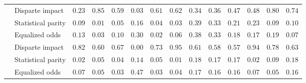 \begin{sidewaystable}
\begin{tabular}{ll
            				ccc
            				ccc
            				ccc
            				ccc}
              & Disparte impact&  $ 0.23 $ &  $ \mathbf{0.85} $ &  $ \mathbf{0.59} $ &  $ 0.03 $ &  $ \mathbf{0.61} $ &  $ \mathbf{0.62} $ &  $ 0.34 $ &  $ \mathbf{0.36} $ &  $ \mathbf{0.47} $ &  $ 0.48 $ &  $ \mathbf{0.80} $ &  $ \mathbf{0.74} $  \\
              & Statistical parity&  $ 0.09 $ &  $ \mathbf{0.01} $ &  $ \mathbf{0.05} $ &  $ 0.16 $ &  $ \mathbf{0.04} $ &  $ \mathbf{0.03} $ &  $ 0.39 $ &  $ \mathbf{0.33} $ &  $ \mathbf{0.21} $ &  $ 0.23 $ &  $ \mathbf{0.09} $ &  $ \mathbf{0.10} $  \\
              & Equalized odds&  $ 0.13 $ &  $ \mathbf{0.03} $ &  $ \mathbf{0.10} $ &  $ 0.30 $ &  $ \mathbf{0.02} $ &  $ \mathbf{0.06} $ &  $ 0.38 $ &  $ \mathbf{0.33} $ &  $ \mathbf{0.18} $ &  $ 0.17 $ &  $ 0.19 $ &  $ \mathbf{0.07} $  \\
              \midrule
              & Disparte impact&  $ 0.82 $ &  $ 0.60 $ &  $ 0.67 $ &  $ 0.00 $ &  $ \mathbf{0.73} $ &  $ \mathbf{0.95} $ &  $ 0.61 $ &  $ 0.58 $ &  $ 0.57 $ &  $ 0.94 $ &  $ 0.78 $ &  $ 0.63 $  \\
              & Statistical parity&  $ 0.02 $ &  $ 0.05 $ &  $ 0.04 $ &  $ 0.14 $ &  $ \mathbf{0.05} $ &  $ \mathbf{0.01} $ &  $ 0.18 $ &  $ \mathbf{0.17} $ &  $ \mathbf{0.17} $ &  $ 0.02 $ &  $ 0.09 $ &  $ 0.18 $  \\
              & Equalized odds&  $ 0.07 $ &  $ \mathbf{0.05} $ &  $ \mathbf{0.03} $ &  $ 0.47 $ &  $ \mathbf{0.03} $ &  $ \mathbf{0.04} $ &  $ 0.17 $ &  $ \mathbf{0.16} $ &  $ \mathbf{0.16} $ &  $ 0.07 $ &  $ \mathbf{0.05} $ &  $ 0.16 $  \\
              
              
              
              
              
               
               
                \bottomrule
    \end{tabular}

\end{sidewaystable}
